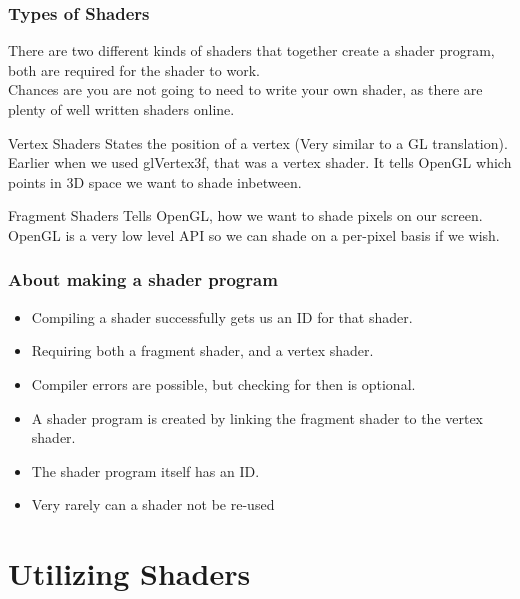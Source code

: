 \documentclass{beamer}
\begin{document}
\begin{frame}

  \frametitle{Types of Shaders}
  There are two different kinds of shaders that together create a shader program, both are required for the shader to work.\\
  Chances are you are not going to need to write your own shader, as there are plenty of well written shaders online.\\
  \begin{block}{Vertex Shaders}
    States the position of a vertex (Very similar to a GL translation). Earlier when we used glVertex3f, that was a vertex shader. It tells OpenGL which points in 3D space we want to shade inbetween.
  \end{block}

  \begin{block}{Fragment Shaders}
    Tells OpenGL, how we want to shade pixels on our screen. OpenGL is a very low level API so we can shade on a per-pixel basis if we wish.
  \end{block}
\end{frame}

\begin{frame}

  \frametitle{About making a shader program}

  \begin{itemize}
  \item Compiling a shader successfully gets us an ID for that shader.
  \item Requiring both a fragment shader, and a vertex shader.
  \item Compiler errors are possible, but checking for then is optional.
  \item A shader program is created by linking the fragment shader to the vertex shader.
  \item The shader program itself has an ID.
  \item Very rarely can a shader not be re-used
  \end{itemize}

\end{frame}


\section{Utilizing Shaders}
\end{document}
